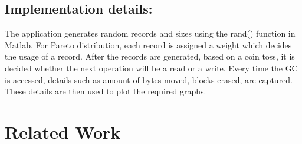 \subsection*{Implementation details:}
The application generates random records and sizes using the rand() function in Matlab. For Pareto distribution, each record is assigned a weight which decides the usage of a record. After the records are generated, based on a coin toss, it is decided whether the next operation will be a read or a write. Every time the GC is accessed, details such as amount of bytes moved, blocks erased, are captured. These details are then used to plot the required graphs. 

\section{Related Work}


